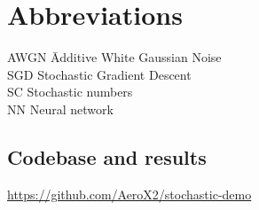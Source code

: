 \documentclass[a4paper,oneside,phd,etd]{BYUPhys}
\begin{document}
\clearemptydoublepage
\chapter{Abbreviations}
\label{chap:abbreviations}

\begin{tabbing}

AWGN \qquad \qquad \= Additive White Gaussian Noise\\
SGD \> Stochastic Gradient Descent\\
SC \> Stochastic numbers\\
NN \> Neural network \\
\end{tabbing}


\appendix
\section{Codebase and results}
\url{https://github.com/AeroX2/stochastic-demo}

%

%


%
\end{document}
